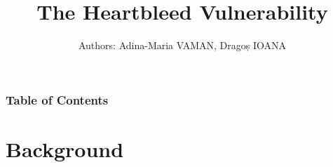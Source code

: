 \documentclass[
    11pt, %
    aspectratio=169, %
]{beamer}
\title{The Heartbleed Vulnerability}
\author{Authors: Adina-Maria VAMAN, Dragoș IOANA}
\date[\today]
\begin{document}
\section{}
\begin{frame}
	\titlepage %
\end{frame}


\begin{frame}
	\frametitle{Table of Contents} %
	
	\tableofcontents %
\end{frame}

\section{Background} %
\end{document}

